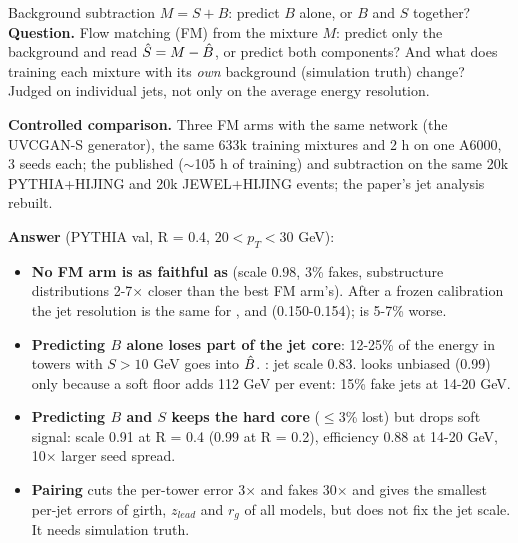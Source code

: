 
\begin{frame}{Background subtraction $M = S + B$: predict $B$ alone, or $B$ and $S$ together?}
\small
\textbf{Question.} Flow matching (FM) from the mixture $M$: predict only the background and read
$\hat S = M - \hat B$, or predict both components? And what does training each mixture with its
\emph{own} background (simulation truth) change? Judged on individual jets, not only on the
average energy resolution.

\vspace{0.4em}
\textbf{Controlled comparison.} Three FM arms with the same network (the UVCGAN-S generator),
the same 633k training mixtures and 2 h on one A6000, 3 seeds each; the published
\uv{} (${\sim}$105 h of training) and \area{} subtraction on the same 20k PYTHIA+HIJING and
20k JEWEL+HIJING events; the paper's jet analysis rebuilt.

\vspace{0.4em}
\textbf{Answer} (PYTHIA val, R = 0.4, $20 < p_T < 30$ GeV):
\begin{itemize}\setlength\itemsep{0.15em}
\item \textbf{No FM arm is as faithful as \uv{}} (scale 0.98, 3\% fakes, substructure
  distributions 2-7$\times$ closer than the best FM arm's). After a frozen calibration the jet
  resolution is the same for \uv{}, \unp{} and \pai{} (0.150-0.154); \jnt{} is 5-7\% worse.
\item \textbf{Predicting $B$ alone loses part of the jet core}: 12-25\% of the energy in towers
  with $S > 10$ GeV goes into $\hat B$. \pai{}: jet scale 0.83. \unp{} looks unbiased (0.99) only
  because a soft floor adds 112 GeV per event: 15\% fake jets at 14-20 GeV.
\item \textbf{Predicting $B$ and $S$ keeps the hard core} ($\le$3\% lost) but drops soft signal:
  scale 0.91 at R = 0.4 (0.99 at R = 0.2), efficiency 0.88 at 14-20 GeV, 10$\times$ larger seed
  spread.
\item \textbf{Pairing} cuts the per-tower error 3$\times$ and fakes 30$\times$ and gives the
  smallest per-jet errors of girth, $z_{lead}$ and $r_g$ of all models, but does not fix the
  jet scale. It needs simulation truth.
\end{itemize}
\end{frame}

